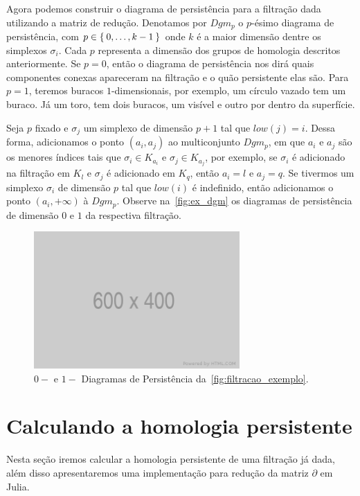 Agora podemos construir o diagrama de persistência para a filtração dada
utilizando a matriz de redução. Denotamos por $Dgm_p$ o $p$-ésimo diagrama
de persistência, com $p \in \Set{0,\dots,k-1}$ onde $k$ é a maior dimensão
dentre os simplexos $\sigma_i$. Cada $p$ representa a dimensão dos grupos de
homologia descritos anteriormente. Se $p=0$, então o diagrama de persistência
nos dirá quais componentes conexas apareceram na filtração e o quão persistente
elas são. Para $p=1$, teremos buracos $1$-dimensionais, por exemplo, um círculo
vazado tem um buraco. Já um toro, tem dois buracos, um visível e outro por
dentro da superfície.

Seja $p$ fixado e $\sigma_j$ um simplexo de dimensão $p+1$ tal que $low(j)=i$.
Dessa forma, adicionamos o ponto $(a_i, a_j)$ ao multiconjunto $Dgm_p$, em que
$a_i$ e $a_j$ são os menores índices tais que $\sigma_i \in K_{a_i}$ e $\sigma_j
\in K_{a_j}$, por exemplo, se $\sigma_i$ é adicionado na filtração em $K_l$ e
$\sigma_j$ é adicionado em $K_q$, então $a_i = l$ e $a_j = q$. Se tivermos um
simplexo $\sigma_i$ de dimensão $p$ tal que $low(i)$ é indefinido, então
adicionamos o ponto $(a_i, +\infty)$ à $Dgm_p$. Observe na~\autoref{fig:ex_dgm}
os diagramas de persistência de dimensão $0$ e $1$ da respectiva filtração.
\begin{figure}[!htpb]
  \centering
  \includegraphics[width=0.7\textwidth]{images/placeholder.png}
  \caption{$0-$ e $1-$ Diagramas de Persistência da~\autoref{fig:filtracao_exemplo}.}
  \label{fig:ex_dgm}
  \fautor
\end{figure}

\section{Calculando a homologia persistente}
Nesta seção iremos calcular a homologia persistente de uma filtração já dada,
além disso apresentaremos uma implementação para redução da matriz $\partial$
em Julia.

